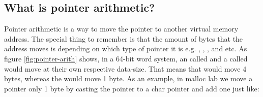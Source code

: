 \subsection{What is pointer arithmetic?}
Pointer arithmetic is a way to move the pointer to another virtual memory address. The special thing to remember is that the amount of bytes that the address moves is depending on which type of pointer it is e.g. , , , and etc.
As figure \ref{fig:pointer-arith} shows, in a 64-bit word system, an  called  and a  called  would move at their own respective data-size. That means that  would move 4 bytes, whereas the  would move 1 byte.
As an example, in malloc lab we move a pointer only 1 byte by casting the pointer to a char pointer and add one just like: 
\begin{figure}[h]
    \centering
\end{figure}